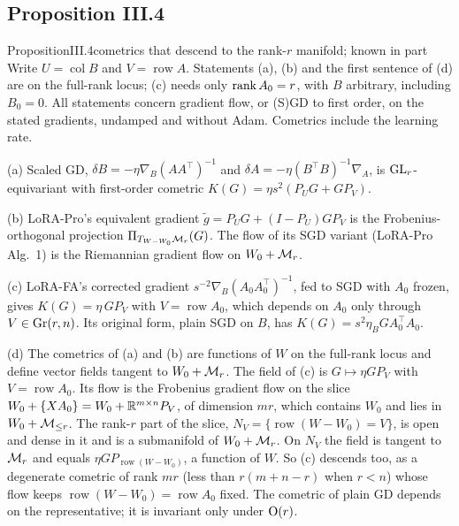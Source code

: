 \subsection{Proposition III.4}\label{proof:III.4}

\begin{restate}{Proposition}{III.4}{cometrics that descend to the rank-$r$ manifold; known in part}
Write $U=\operatorname{col}B$ and $V=\operatorname{row}A$. Statements (a), (b) and the first sentence of (d) are on the
full-rank locus; (c) needs only $\operatorname{rank} A_0=r$, with $B$ arbitrary, including $B_0=0$. All statements concern gradient
flow, or (S)GD to first order, on the stated gradients, undamped and without Adam. Cometrics include the learning rate.

(a) Scaled GD, $\delta B=-\eta\nabla_B(AA^\top)^{-1}$ and $\delta A=-\eta(B^\top B)^{-1}\nabla_A$, is $\mathrm{GL}_r$-equivariant
with first-order cometric $K(G)=\eta s^2(P_UG+GP_V)$.

(b) LoRA-Pro's equivalent gradient $\tilde g=P_UG+(I-P_U)GP_V$ is the Frobenius-orthogonal projection
$\Pi_{T_{W-W_0}\mathcal{M}_r}(G)$. The flow of its SGD variant (LoRA-Pro Alg.~1) is the Riemannian gradient flow on
$W_0+\mathcal{M}_r$.

(c) LoRA-FA's corrected gradient $s^{-2}\nabla_B(A_0A_0^\top)^{-1}$, fed to SGD with $A_0$ frozen, gives
$K(G)=\eta\,GP_V$ with $V=\operatorname{row}A_0$, which depends on $A_0$ only through $V\in\operatorname{Gr}(r,n)$. Its original form,
plain SGD on $B$, has $K(G)=s^2\eta_BGA_0^\top A_0$.

(d) The cometrics of (a) and (b) are functions of $W$ on the full-rank locus and define vector fields tangent to
$W_0+\mathcal{M}_r$. The field of (c) is $G\mapsto\eta GP_V$ with $V=\operatorname{row}A_0$. Its flow is the Frobenius gradient
flow on the slice $W_0+\{XA_0\}=W_0+\mathbb{R}^{m\times n}P_V$, of dimension $mr$, which contains $W_0$ and lies in $W_0+\mathcal{M}_{\le r}$.
The rank-$r$ part of the slice, $N_V=\{\operatorname{row}(W-W_0)=V\}$, is open and dense in it and is a submanifold of
$W_0+\mathcal{M}_r$. On $N_V$ the field is tangent to $\mathcal{M}_r$ and equals $\eta GP_{\operatorname{row}(W-W_0)}$, a function of
$W$. So (c) descends too, as a degenerate cometric of rank $mr$ (less than $r(m+n-r)$ when $r<n$) whose flow keeps
$\operatorname{row}(W-W_0)=\operatorname{row}A_0$ fixed. The cometric of plain GD depends on the representative; it is
invariant only under $\mathrm{O}(r)$.
\end{restate}

